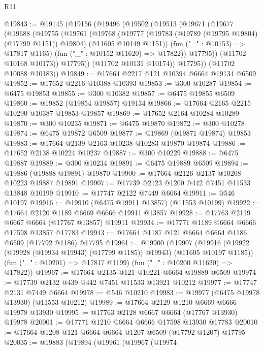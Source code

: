 \begin{lexlean}{R11}
\begin{coremodule}
@19843 := @19145
    (@19156
      (@19496
        (@19502
          (@19513
            (@19671
              (@19677
                (@19688
                  (@19755
                    (@19761
                      (@19768
                        (@19777
                          (@19783 (@19789 (@19795 @19804) (@17799 @1151)) @19804)
                          (@11605 @10149 @1151))
                        (fun ("_" : @10153) => @17817 @1165)
                        (fun ("_" : @10152 @11620) => @17822))
                      @17795))
                  (@11702 @10168 @10173))
                @17795))
            (@11702 @10131 @10174))
          @17795))
      (@11702 @10088 @10183))
@19849 := @17664 @2217 @121 @10394 @6664 @19134 @6509
@19852 := @17652 @2216 @10388 @10393
@19853 := @300 @10287
@19854 := @6475 @19853
@19855 := @300 @10382
@19857 := @6475 @19855 @6509
@19860 := @19852 (@19854 @19857) @19134
@19866 := @17664 @2165 @2215 @10290 @10387 @19853 @19857
@19869 := @17652 @2164 @10284 @10289
@19870 := @300 @10235
@19871 := @6475 @19870
@19872 := @300 @10278
@19874 := @6475 @19872 @6509
@19877 := @19869 (@19871 @19874) @19853
@19883 := @17664 @2139 @2163 @10238 @10283 @19870 @19874
@19886 := @17652 @2138 @10224 @10237
@19887 := @300 @10229
@19888 := @6475 @19887
@19889 := @300 @10234
@19891 := @6475 @19889 @6509
@19894 := @19886 (@19888 @19891) @19870
@19900 := @17664 @2126 @2137 @10208 @10223 @19887 @19891
@19907 := @17739 @2123 @1200 @442 @7451 @11533 @13848 @10199
@19910 := @17747 @2122 @7449 @6664
@19911 := @546 @10197
@19916 := @19910 (@6475 @19911 @13857) (@11553 @10199)
@19922 := @17664 @2120 @1189 @6669 @6666 @19911 @13857
@19928 := @17763 @2119 @6667 @6664 (@17767 @13857) @19911
@19934 := @17771 @1189 @6664 @6666 @17598 @13857 @17783
@19943 := @17664 @1187 @121 @6664 @6664 @1186 @6509 (@17792 @1186) @17795
@19961 := @19900
    (@19907
      (@19916 (@19922 (@19928 (@19934 @19943) (@17799 @1185)) @19943) (@11605 @10197 @1185))
      (fun ("_" : @10201) => @17817 @1199)
      (fun ("_" : @10200 @11620) => @17822))
@19967 := @17664 @2135 @121 @10221 @6664 @19889 @6509
@19974 := @17739 @2132 @439 @442 @7451 @11533 @13921 @10212
@19977 := @17747 @2131 @7449 @6664
@19978 := @546 @10210
@19983 := @19977 (@6475 @19978 @13930) (@11553 @10212)
@19989 := @17664 @2129 @1210 @6669 @6666 @19978 @13930
@19995 := @17763 @2128 @6667 @6664 (@17767 @13930) @19978
@20001 := @17771 @1210 @6664 @6666 @17598 @13930 @17783
@20010 := @17664 @1208 @121 @6664 @6664 @1207 @6509 (@17792 @1207) @17795
@20035 := @19883
    (@19894
      (@19961
        (@19967
          (@19974

\end{coremodule}
\end{lexlean}
